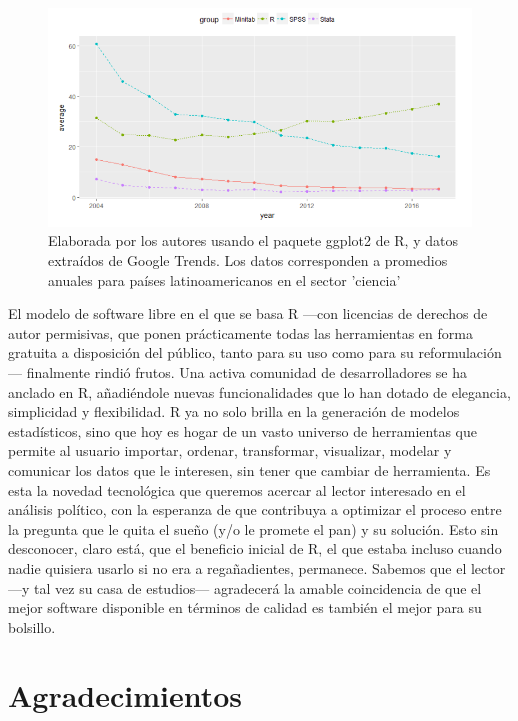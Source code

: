 \documentclass[]{book}
\begin{document}
\begin{figure}

{\centering \includegraphics[width=1\linewidth]{00-images/pref-gtrends} 

}

\caption{Elaborada por los autores usando el paquete ggplot2 de R, y datos extraídos de Google Trends. Los datos corresponden a promedios anuales para países latinoamericanos en el sector 'ciencia'}\label{fig:pref-gtrends}
\end{figure}

El modelo de software libre en el que se basa R ---con licencias de
derechos de autor permisivas, que ponen prácticamente todas las
herramientas en forma gratuita a disposición del público, tanto para su
uso como para su reformulación--- finalmente rindió frutos. Una activa
comunidad de desarrolladores se ha anclado en R, añadiéndole nuevas
funcionalidades que lo han dotado de elegancia, simplicidad y
flexibilidad. R ya no solo brilla en la generación de modelos
estadísticos, sino que hoy es hogar de un vasto universo de herramientas
que permite al usuario importar, ordenar, transformar, visualizar,
modelar y comunicar los datos que le interesen, sin tener que cambiar de
herramienta. Es esta la novedad tecnológica que queremos acercar al
lector interesado en el análisis político, con la esperanza de que
contribuya a optimizar el proceso entre la pregunta que le quita el
sueño (y/o le promete el pan) y su solución. Esto sin desconocer, claro
está, que el beneficio inicial de R, el que estaba incluso cuando nadie
quisiera usarlo si no era a regañadientes, permanece. Sabemos que el
lector ---y tal vez su casa de estudios--- agradecerá la amable
coincidencia de que el mejor software disponible en términos de calidad
es también el mejor para su bolsillo.

\section{Agradecimientos}\label{agradecimientos}
\end{document}
